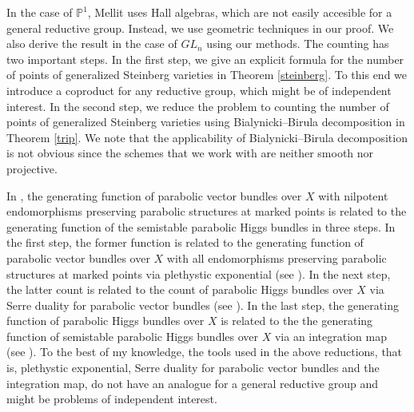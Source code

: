 \documentclass{amsart}
\theoremstyle{plain}
\theoremstyle{definition}
\theoremstyle{remark}
\begin{document}
In the case of $\mathbb{P}^1$, Mellit uses Hall algebras, which are not easily accesible for a general reductive group. Instead, we use geometric techniques in our proof. We also derive the result in the case of $GL_n$ using our methods.
The counting has two important steps. 
In the first step, we give an explicit formula for the number of points of generalized Steinberg varieties in Theorem \ref{steinberg}. To this end we introduce a coproduct for any reductive group, which might be of independent interest. In the second step, we reduce the problem to counting the number of points of generalized Steinberg varieties using Bialynicki--Birula decomposition in Theorem \ref{trip}. We note that the applicability of Bialynicki--Birula decomposition is not obvious since the schemes that we work with are neither smooth nor projective.

In \cite[Section 7]{Mel}, the generating function of parabolic vector bundles over $X$ with nilpotent endomorphisms preserving parabolic structures at marked points is related to the generating function of the semistable parabolic Higgs bundles in three steps. In the first step, the former function
is related to the generating function of parabolic vector bundles over $X$ with all endomorphisms preserving parabolic structures at marked points via plethystic exponential (see \cite[Section 7.2]{Mel} ). In the next step, the latter count 
is related to the count of parabolic Higgs bundles over $X$ via Serre duality for parabolic vector bundles (see \cite[Section 7.3]{Mel} ). In the last step, the generating function of parabolic Higgs bundles over $X$ is related to the the generating function of semistable parabolic Higgs bundles over $X$ via an integration map (see \cite[Section 7.4]{Mel}). %
To the best of my knowledge, the tools used in the above reductions, that is, plethystic exponential, Serre duality for parabolic vector bundles and the integration map, do not have an analogue for a general reductive group and might be problems of independent interest.
\end{document}

